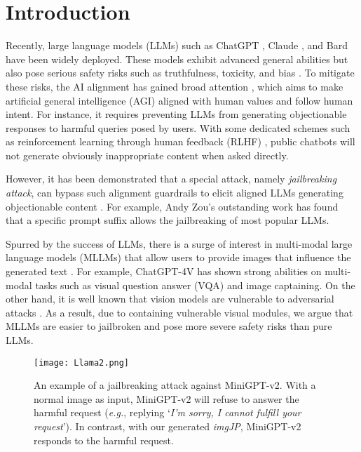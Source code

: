 \section{Introduction}
\label{sec:intro}
Recently, large language models (LLMs) such as ChatGPT \cite{brown2020language}, Claude \cite{bai2022training}, and Bard \cite{thoppilan2022lamda, bard} have been widely deployed. These models exhibit advanced general abilities but also pose serious safety risks such as truthfulness, toxicity, and bias \cite{gehman2020realtoxicityprompts,perez2022red,sheng2019woman,abid2021persistent,carlini2021extracting}. To mitigate these risks, the AI alignment has gained broad attention \cite{ouyang2022training, bai2022constitutional, korbak2023pretraining}, which aims to make artificial general intelligence (AGI) aligned with human values and follow human intent. 
For instance, it requires preventing LLMs from generating objectionable responses to harmful queries posed by users. With some dedicated schemes such as reinforcement learning through human feedback (RLHF) \cite{ziegler2019fine}, public chatbots will not generate obviously inappropriate content when asked directly. 

However, it has been demonstrated that a special attack, namely \emph{jailbreaking attack}, can bypass such alignment guardrails to elicit aligned LLMs generating objectionable content \cite{wei2023jailbroken}. For example, Andy Zou's
outstanding work  has found that a specific prompt suffix allows the jailbreaking of most popular LLMs. 

Spurred by the success of LLMs, there is a surge of interest in multi-modal large language models (MLLMs) that allow users to provide images that influence the generated text \cite{liu2023visual,instructblip,zhu2023minigpt, chen2023minigpt,alayrac2022flamingo,ye2023mplug, Qwen-VL,gpt4v}. For example, ChatGPT-4V \cite{gpt4v} has shown strong abilities on multi-modal tasks such as visual question answer (VQA) and image captaining. On the other hand, it is well known that vision models are vulnerable to adversarial attacks \cite{naseer2021improving, mahmood2021robustness, wei2022towards, fu2022patch}. As a result, due to containing vulnerable visual modules, we argue that MLLMs are easier to jailbroken and pose more severe safety risks than pure LLMs.

\begin{figure}[bpt]
\centering
\texttt{[image: Llama2.png]}
\vspace{-1.0em}
\caption{An example of a jailbreaking attack against MiniGPT-v2. With a normal image as input, MiniGPT-v2 will refuse to answer the harmful request (\emph{e.g.}, replying `\emph{I'm sorry, I cannot fulfill your request}'). In contrast, with our generated \emph{imgJP}, MiniGPT-v2 responds to the harmful request.}
\label{fig1}
\vspace{-1.0em}
\end{figure}

